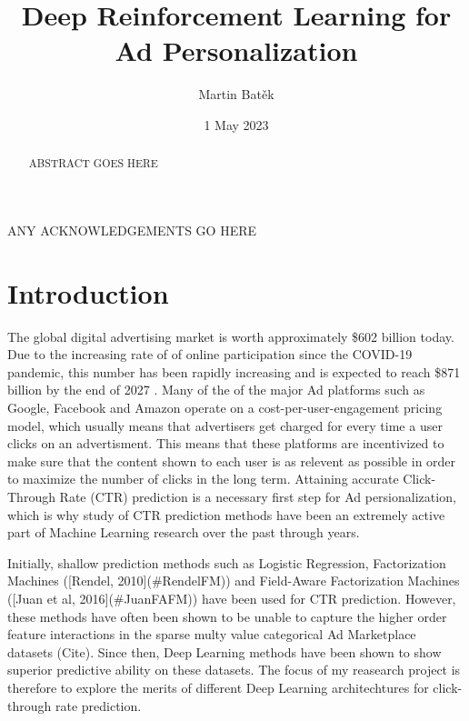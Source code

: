 \documentclass{mldsmsc}
\title{Deep Reinforcement Learning for Ad Personalization}
\author{Martin Bat\v{e}k}
\date{1 May 2023}
\begin{document}
\maketitle


\declaration 


\begin{abstract}
    ABSTRACT GOES HERE
\end{abstract}

\begin{acknowledgements}
    ANY ACKNOWLEDGEMENTS GO HERE
\end{acknowledgements}


\tableofcontents

\mainmatter


\chapter{Introduction}

The global digital advertising market is worth approximately \$602 billion today. Due to the increasing rate of of online participation since the 
COVID-19 pandemic, this number has been rapidly increasing and is expected to reach \$871 billion by the end of 2027 \citep{RefWorks:emarketer2023digital}. 
Many of the of the major Ad platforms such as Google, Facebook and Amazon operate on a cost-per-user-engagement pricing model, which usually means that 
advertisers get charged for every time a user clicks on an advertisment. This means that these platforms are incentivized to make sure that the content 
shown to each user is as relevent as possible in order to maximize the number of clicks in the long term. Attaining accurate Click-Through Rate (CTR) 
prediction is a necessary first step for Ad persionalization, which is why study of CTR prediction methods have been an extremely active part of 
Machine Learning research over the past through years.

Initially, shallow prediction methods such as Logistic Regression, Factorization Machines ([Rendel, 2010](#RendelFM)) and Field-Aware Factorization 
Machines ([Juan et al, 2016](#JuanFAFM)) have been used for CTR prediction. However, these methods have often been shown to be unable to capture the 
higher order feature interactions in the sparse multy value categorical Ad Marketplace datasets (Cite). Since then, Deep Learning methods have been 
shown to show superior predictive ability on these datasets. The focus of my reasearch project is therefore to explore the merits of different Deep 
Learning architechtures for click-through rate prediction.
\end{document}
